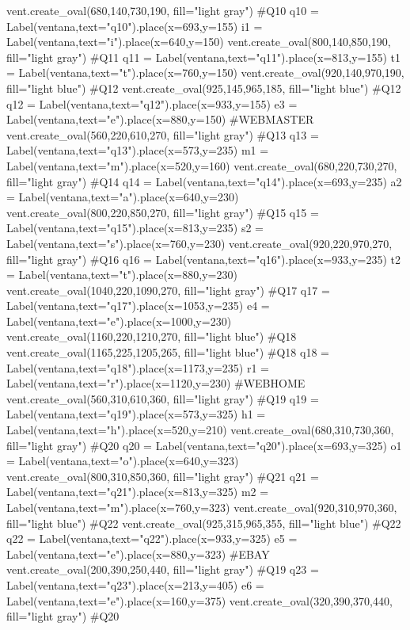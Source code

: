 \documentclass{article}
\begin{document}
\begin{python}
			vent.create_oval(680,140,730,190, fill="light gray") #Q10
			q10 = Label(ventana,text="q10").place(x=693,y=155)
			i1 = Label(ventana,text="i").place(x=640,y=150)
			vent.create_oval(800,140,850,190, fill="light gray") #Q11
			q11 = Label(ventana,text="q11").place(x=813,y=155)
			t1 = Label(ventana,text="t").place(x=760,y=150)
			vent.create_oval(920,140,970,190, fill="light blue") #Q12
			vent.create_oval(925,145,965,185, fill="light blue") #Q12
			q12 = Label(ventana,text="q12").place(x=933,y=155)
			e3 = Label(ventana,text="e").place(x=880,y=150)
			#WEBMASTER
			vent.create_oval(560,220,610,270, fill="light gray") #Q13
			q13 = Label(ventana,text="q13").place(x=573,y=235)
			m1 = Label(ventana,text="m").place(x=520,y=160)
			vent.create_oval(680,220,730,270, fill="light gray") #Q14
			q14 = Label(ventana,text="q14").place(x=693,y=235)
			a2 = Label(ventana,text="a").place(x=640,y=230)
			vent.create_oval(800,220,850,270, fill="light gray") #Q15
			q15 = Label(ventana,text="q15").place(x=813,y=235)
			s2 = Label(ventana,text="s").place(x=760,y=230)
			vent.create_oval(920,220,970,270, fill="light gray") #Q16
			q16 = Label(ventana,text="q16").place(x=933,y=235)
			t2 = Label(ventana,text="t").place(x=880,y=230)
			vent.create_oval(1040,220,1090,270, fill="light gray") #Q17
			q17 = Label(ventana,text="q17").place(x=1053,y=235)
			e4 = Label(ventana,text="e").place(x=1000,y=230)
			vent.create_oval(1160,220,1210,270, fill="light blue") #Q18
			vent.create_oval(1165,225,1205,265, fill="light blue") #Q18
			q18 = Label(ventana,text="q18").place(x=1173,y=235)
			r1 = Label(ventana,text="r").place(x=1120,y=230)
			#WEBHOME
			vent.create_oval(560,310,610,360, fill="light gray") #Q19
			q19 = Label(ventana,text="q19").place(x=573,y=325)
			h1 = Label(ventana,text="h").place(x=520,y=210)
			vent.create_oval(680,310,730,360, fill="light gray") #Q20
			q20 = Label(ventana,text="q20").place(x=693,y=325)
			o1 = Label(ventana,text="o").place(x=640,y=323)
			vent.create_oval(800,310,850,360, fill="light gray") #Q21
			q21 = Label(ventana,text="q21").place(x=813,y=325)
			m2 = Label(ventana,text="m").place(x=760,y=323)
			vent.create_oval(920,310,970,360, fill="light blue") #Q22
			vent.create_oval(925,315,965,355, fill="light blue") #Q22
			q22 = Label(ventana,text="q22").place(x=933,y=325)
			e5 = Label(ventana,text="e").place(x=880,y=323)
			#EBAY
			vent.create_oval(200,390,250,440, fill="light gray") #Q19
			q23 = Label(ventana,text="q23").place(x=213,y=405)
			e6 = Label(ventana,text="e").place(x=160,y=375)
			vent.create_oval(320,390,370,440, fill="light gray") #Q20

\end{python}
\end{document}
